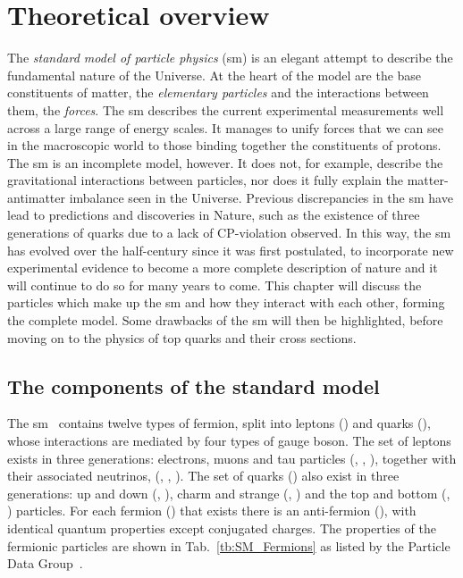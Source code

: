 \chapter{Theoretical overview}
\label{ch:Theory}

The \textit{standard model of particle physics} (\acrshort{sm}) is an elegant attempt to describe the fundamental nature of the Universe.
At the heart of the model are the base constituents of matter, the \textit{elementary particles} and the interactions between them, the \textit{forces}.
The \acrshort{sm} describes the current experimental measurements well across a large range of energy scales.
It manages to unify forces that we can see in the macroscopic world to those binding together the constituents of protons.
The \acrshort{sm} is an incomplete model, however. 
It does not, for example, describe the gravitational interactions between particles, nor does it fully explain the matter-antimatter imbalance seen in the Universe.
Previous discrepancies in the \acrshort{sm} have lead to predictions and discoveries in Nature, such as the existence of three generations of quarks due to a lack of CP-violation observed. 
In this way, the \acrshort{sm} has evolved over the half-century since it was first postulated, to incorporate new experimental evidence to become a more complete description of nature and it will continue to do so for many years to come.
This chapter will discuss the particles which make up the \acrshort{sm} and how they interact with each other, forming the complete model.
Some drawbacks of the \acrshort{sm} will then be highlighted, before moving on to the physics of top quarks and their cross sections.

\section{The components of the standard model}
\label{sec:SM}

The \acrshort{sm}~\cite{Th:SM1, Th:SM2, Th:SM3, Th:SM4, Th:SM5} contains twelve types of fermion, split into leptons (\lepton{}) and quarks (\quark{}), whose interactions are mediated by four types of gauge boson.
The set of leptons exists in three generations: electrons, muons and tau particles (\electron{}, \muon{}, \tauon{}), together with their associated neutrinos, (\nue{}, \numu{}, \nutau{}). 
The set of quarks (\quark{}) also exist in three generations: up and down (\uquark{}, \dquark{}), charm and strange (\cquark{}, \squark{}) and the top and bottom (\tquark{}, \bquark{}) particles. 
For each fermion (\fermion{}) that exists there is an anti-fermion (\antifermion{}), with identical quantum properties except conjugated charges.
The properties of the fermionic particles are shown in Tab.~\ref{tb:SM_Fermions} as listed by the Particle Data Group~\cite{PDG}.


